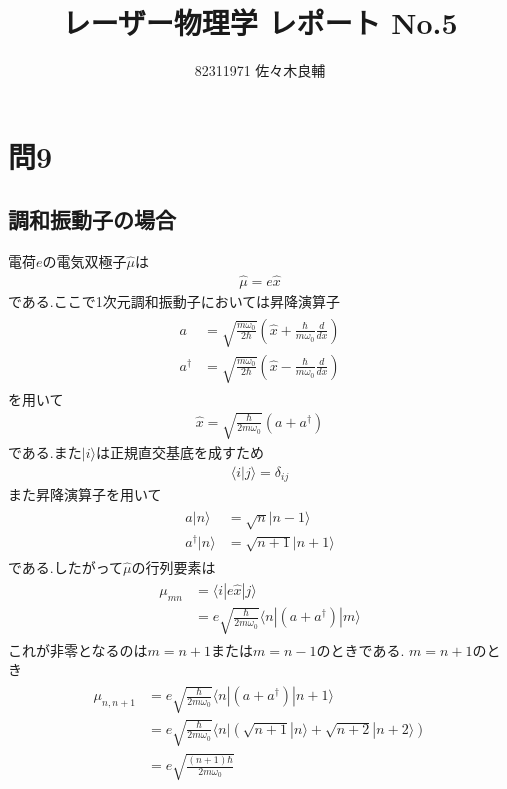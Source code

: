 \documentclass[uplatex,a4j,11pt,dvipdfmx]{jsarticle}
\begin{document}
\title{レーザー物理学 レポート No.5}
\author{82311971 佐々木良輔}
\date{}
\maketitle
\section*{問9}
\subsection*{調和振動子の場合}
電荷$e$の電気双極子$\hat{\mu}$は
\begin{align}
  \hat{\mu}=e\hat{x}
\end{align}
である.ここで1次元調和振動子においては昇降演算子
\begin{align}
  \begin{split}
    a&=\sqrt{\frac{m\omega_0}{2\hbar}}\left(\hat{x}+\frac{\hbar}{m\omega_0}\frac{d}{dx}\right)\\
    a^\dag&=\sqrt{\frac{m\omega_0}{2\hbar}}\left(\hat{x}-\frac{\hbar}{m\omega_0}\frac{d}{dx}\right)
  \end{split}
\end{align}
を用いて
\begin{align}
  \hat{x}=\sqrt{\frac{\hbar}{2m\omega_0}}\left(a+a^\dag\right)
\end{align}
である.また$|i\rangle$は正規直交基底を成すため
\begin{align}
  \langle i|j\rangle=\delta_{ij}
\end{align}
また昇降演算子を用いて
\begin{align}
  \begin{split}
    a|n\rangle&=\sqrt{n}|n-1\rangle\\
    a^\dag|n\rangle&=\sqrt{n+1}|n+1\rangle
  \end{split}
\end{align}
である.したがって$\hat{\mu}$の行列要素は
\begin{align}
  \begin{split}
    \mu_{mn}&=\langle i|e\hat{x}|j\rangle\\
    &=e\sqrt{\frac{\hbar}{2m\omega_0}}\langle n|\left(a+a^\dag\right)|m\rangle
  \end{split}
\end{align}
これが非零となるのは$m=n+1$または$m=n-1$のときである.
$m=n+1$のとき
\begin{align}
  \begin{split}
    \mu_{n,n+1}&=e\sqrt{\frac{\hbar}{2m\omega_0}}\langle n|\left(a+a^\dag\right)|n+1\rangle\\
    &=e\sqrt{\frac{\hbar}{2m\omega_0}}\langle n|\left(\sqrt{n+1}|n\rangle+\sqrt{n+2}|n+2\rangle\right)\\
    &=e\sqrt{\frac{(n+1)\hbar}{2m\omega_0}}
  \end{split}
\end{align}
\end{document}
